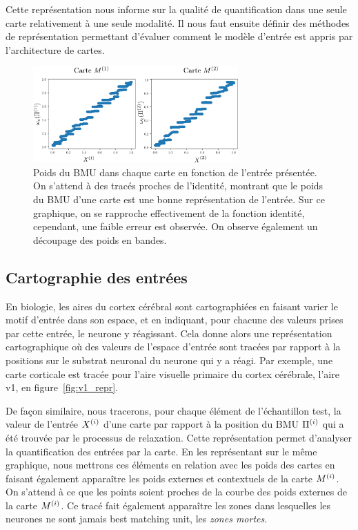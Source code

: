 Cette représentation nous informe sur la qualité de quantification dans une seule carte relativement à une seule modalité. Il nous faut ensuite définir des méthodes de représentation permettant d'évaluer comment le modèle d'entrée est appris par l'architecture de cartes.

\begin{figure}
    \centering
    \includegraphics[width=0.7\textwidth]{w_x.pdf}
    \caption{Poids du BMU dans chaque carte en fonction de l'entrée présentée. On s'attend à des tracés proches de l'identité, montrant que le poids du BMU d'une carte est une bonne représentation de l'entrée. Sur ce graphique, on se rapproche effectivement de la fonction identité, cependant, une faible erreur est observée. On observe également un découpage des poids en bandes.\label{fig:erreur}}
\end{figure}


\subsection{Cartographie des entrées}

En biologie, les aires du cortex cérébral sont cartographiées en faisant varier le motif d'entrée dans son espace, et en indiquant, pour chacune des valeurs prises par cette entrée, le neurone y réagissant. Cela donne alors une représentation cartographique où des valeurs de l'espace d'entrée sont tracées par rapport à la positions sur le substrat neuronal du neurone qui y  a réagi.
Par exemple, une carte corticale est tracée pour l'aire visuelle primaire du cortex cérébrale, l'aire v1, en figure~\ref{fig:v1_repr}.

De façon similaire, nous tracerons, pour chaque élément de l'échantillon test, la valeur de l'entrée $X^{({i})}$ d'une carte par rapport à la position du BMU $\Pi^{({i})}$ qui a été trouvée par le processus de relaxation.
Cette représentation permet d'analyser la quantification des entrées par la carte. En les représentant sur le même graphique, nous mettrons ces éléments en relation avec les poids des cartes en faisant également apparaître les poids externes et contextuels de la carte $M^{({i})}$.
On s'attend à ce que les points soient proches de la courbe des poids externes de la carte $M^{({i})}$.
Ce tracé fait également apparaître les zones dans lesquelles les neurones ne sont jamais best matching unit, les \emph{zones mortes}.

